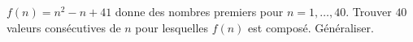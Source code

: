 $f(n) = n^2 - n + 41$ donne des nombres premiers pour $n = 1, \ldots, 40$. Trouver $40$ valeurs consécutives de $n$ pour lesquelles $f(n)$ est composé. Généraliser.
